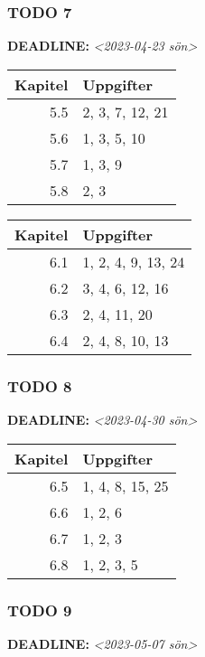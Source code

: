 \documentclass[11pt]{article}
\begin{document}
\subsubsection{{\bfseries\sffamily TODO} 7}
\label{sec:orge40d17c}
\noindent\textbf{DEADLINE:} \textit{<2023-04-23 sön>}\\[0pt]

\begin{center}
\begin{tabular}{rl}
Kapitel & Uppgifter\\[0pt]
\hline
5.5 & 2, 3, 7, 12, 21\\[0pt]
5.6 & 1, 3, 5, 10\\[0pt]
5.7 & 1, 3, 9\\[0pt]
5.8 & 2, 3\\[0pt]
\end{tabular}
\end{center}

\begin{center}
\begin{tabular}{rl}
Kapitel & Uppgifter\\[0pt]
\hline
6.1 & 1, 2, 4, 9, 13, 24\\[0pt]
6.2 & 3, 4, 6, 12, 16\\[0pt]
6.3 & 2, 4, 11, 20\\[0pt]
6.4 & 2, 4, 8, 10, 13\\[0pt]
\end{tabular}
\end{center}

\subsubsection{{\bfseries\sffamily TODO} 8}
\label{sec:org1586930}
\noindent\textbf{DEADLINE:} \textit{<2023-04-30 sön>}\\[0pt]

\begin{center}
\begin{tabular}{rl}
Kapitel & Uppgifter\\[0pt]
\hline
6.5 & 1, 4, 8, 15, 25\\[0pt]
6.6 & 1, 2, 6\\[0pt]
6.7 & 1, 2, 3\\[0pt]
6.8 & 1, 2, 3, 5\\[0pt]
\end{tabular}
\end{center}


\subsubsection{{\bfseries\sffamily TODO} 9}
\label{sec:orgf00b263}
\noindent\textbf{DEADLINE:} \textit{<2023-05-07 sön>}\\[0pt]
\end{document}
